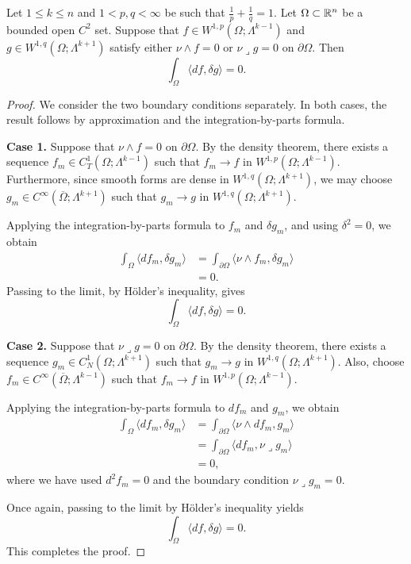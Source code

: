 \begin{corollary}\label{cor:orthogonality}
Let $1\leq k\leq n$ and $1<p,q<\infty$ be such that
$\frac{1}{p}+\frac{1}{q}=1$. Let $\Omega\subset\mathbb{R}^n$ be a
bounded open $C^2$ set. Suppose that
$f\in W^{1,p}(\Omega;\Lambda^{k-1})$ and
$g\in W^{1,q}(\Omega;\Lambda^{k+1})$ satisfy either
$\nu\wedge f=0$ or $\nu\lrcorner g=0$ on $\partial\Omega$.
Then
\[
    \int_\Omega \langle df,\delta g\rangle=0.
\]
\end{corollary}

\begin{proof}
We consider the two boundary conditions separately. In both cases,
the result follows by approximation and the integration-by-parts
formula.

\medskip
\noindent
\textbf{Case 1.} Suppose that $\nu\wedge f=0$ on $\partial\Omega$.
By the density theorem, there exists a sequence
$f_m\in C^1_T(\Omega;\Lambda^{k-1})$ such that
$f_m\to f$ in $W^{1,p}(\Omega;\Lambda^{k-1})$.
Furthermore, since smooth forms are dense in
$W^{1,q}(\Omega;\Lambda^{k+1})$, we may choose
$g_m\in C^\infty(\overline{\Omega};\Lambda^{k+1})$ such that
$g_m\to g$ in $W^{1,q}(\Omega;\Lambda^{k+1})$.

Applying the integration-by-parts formula to $f_m$ and
$\delta g_m$, and using $\delta^2=0$, we obtain
\[
\begin{aligned}
    \int_\Omega\langle df_m,\delta g_m\rangle
    &=\int_{\partial\Omega}
    \langle\nu\wedge f_m,\delta g_m\rangle\\
    &=0.
\end{aligned}
\]
Passing to the limit, by H\"older's inequality, gives
\[
    \int_\Omega\langle df,\delta g\rangle=0.
\]

\medskip
\noindent
\textbf{Case 2.} Suppose that $\nu\lrcorner g=0$ on
$\partial\Omega$. By the density theorem, there exists a sequence
$g_m\in C^1_N(\Omega;\Lambda^{k+1})$ such that
$g_m\to g$ in $W^{1,q}(\Omega;\Lambda^{k+1})$.
Also, choose
$f_m\in C^\infty(\overline{\Omega};\Lambda^{k-1})$ such that
$f_m\to f$ in $W^{1,p}(\Omega;\Lambda^{k-1})$.

Applying the integration-by-parts formula to $df_m$ and $g_m$,
we obtain
\[
\begin{aligned}
    \int_\Omega\langle df_m,\delta g_m\rangle
    &=\int_{\partial\Omega}
    \langle\nu\wedge df_m,g_m\rangle\\
    &=\int_{\partial\Omega}
    \langle df_m,\nu\lrcorner g_m\rangle\\
    &=0,
\end{aligned}
\]
where we have used $d^2f_m=0$ and the boundary condition
$\nu\lrcorner g_m=0$.

Once again, passing to the limit by H\"older's inequality yields
\[
    \int_\Omega\langle df,\delta g\rangle=0.
\]
This completes the proof.
\end{proof}




